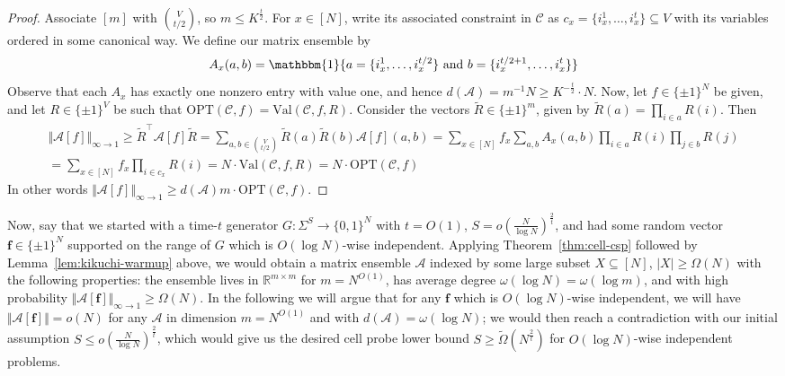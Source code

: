 \documentclass[11pt]{article}
\newcommand{\B}{\{0,1\}}
\newcommand{\norm}[1]{\Vert #1 \Vert}
\newcommand{\Val}{\mathrm{Val}}
\newcommand{\Opt}{\mathrm{OPT}}
\newcommand{\N}{[N]}
\begin{document}
\begin{proof}
Associate $[m]$ with $\binom{V}{t/2}$, so $m \leq K^{\frac{t}{2}}$. For $x \in\N$, write its associated constraint in $\mathcal{C}$ as $c_x = \{i_x^1,\ldots,i^t_x \} \subseteq V$ with its variables ordered in some canonical way. We define our matrix ensemble by 
\[
A_x(a,b) = \mathbbm{1}\{ a = \{i_x^1,\ldots,i_x^{t/2}\} \text{ and } b = \{i_x^{t/2+1},\ldots,i_x^{t}\}\}
\]
Observe that each $A_x$ has exactly one nonzero entry with value one, and hence $d(\mathcal{A}) = m^{-1}N \geq  K^{-\frac{t}{2}} \cdot N$. Now, let $f\in \{\pm 1\}^N$ be given, and let $R\in \{\pm 1\}^V$ be such that $\Opt(\mathcal{C},f) = \Val(\mathcal{C},f,R)$. Consider the vectors $\tilde{R} \in \{\pm 1\}^m$, given by $\tilde{R}(a) = \prod_{i \in a} R(i)$. Then
\begin{gather*}
\norm{\mathcal{A}[f]}_{\infty\to1} \geq \tilde{R}^\top \mathcal{A}[f] \tilde{R} = \sum_{a,b \in \binom{V}{t/2}} \tilde{R}(a) \tilde{R}(b) \mathcal{A}[f](a,b) = 
\sum_{x\in \N} f_x\sum_{a,b} A_x(a,b) \prod_{i\in a} R(i) \prod_{j \in b} R(j)\\
= \sum_{x\in \N} f_x\prod_{i \in c_x} R(i) = N \cdot \Val(\mathcal{C},f,R) = N \cdot \Opt(\mathcal{C},f)
\end{gather*}
In other words $\norm{\mathcal{A}[f]}_{\infty\to1} \geq d(\mathcal{A})m \cdot \Opt(\mathcal{C},f)$.
\end{proof}

Now, say that we started with a time-$t$ generator $G: \Sigma^S \to \B^N$ with $t=O(1)$, $S = o(\frac{N}{\log N})^{\frac{2}{t}}$, and had some random vector $\bm{f} \in \{\pm 1\}^N$ supported on the range of $G$ which is $O(\log N)$-wise independent. Applying Theorem~\ref{thm:cell-csp} followed by Lemma~\ref{lem:kikuchi-warmup} above, we would obtain a matrix ensemble $\mathcal{A}$ indexed by some large subset $X \subseteq \N$, $|X| \geq \Omega(N)$ with the following properties: the ensemble lives in $\mathbb{R}^{m \times m}$ for $m= N^{O(1)}$, has average degree $\omega(\log N) = \omega(\log m)$, and with high probability $\norm{\mathcal{A}[\bm{f}]}_{\infty\to 1} \geq \Omega(N)$. In the following we will argue that for any $\bm{f}$ which is $O(\log N)$-wise independent, we will have  $\norm{\mathcal{A}[\bm{f}]} = o(N)$ for any $\mathcal{A}$ in dimension $m = N^{O(1)}$ and with $d(\mathcal{A}) = \omega(\log N)$; we would then reach a contradiction with our initial assumption $S \leq o(\frac{N}{\log N})^{\frac{2}{t}}$,
which would give us the desired cell probe lower bound $S \geq \tilde{\Omega}(N^{\frac{2}{t}})$ for $O(\log N)$-wise independent problems. 
\end{document}
